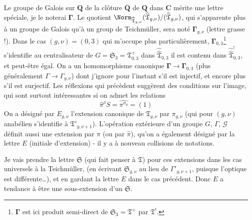 Le groupe de Galois sur $\mathbf{Q}$ de la clôture $\overline{\mathbf{Q}}$ de $\mathbf{Q}$ dans $\mathbf{C}$ mérite une lettre spéciale, je le noterai $\boldsymbol{\Gamma}$. Le quotient $\Norm_{\widehat{\mathfrak{T}}_{g, \nu}}(\widehat{\mathfrak{T}}_{g, \nu})/(\widehat{\mathfrak{T}}_{g, \nu})$, qui s'apparente plus à un groupe de Galois qu'à un group de Teichmüller, sera noté $\boldsymbol{\Gamma}_{g, \nu}$ (lettre grasse !). Dans le cas $(g, \nu) = (0, 3)$ qui m'occupe plus particulièrement, $\boldsymbol{\Gamma}_{0, 3}$\footnote{$\boldsymbol{\Gamma}$ est ici produit semi-direct de $\mathfrak{S}_3 = \mathfrak{T}^+$ par $\mathfrak{T}^!$.} s'identifie au centralisateur de $G = \mathfrak{S}_3 = \mathfrak{T}^+_{0, 3}$ dans $\hat{\hat{\mathfrak{T}}}_{0, 3}$ il est contenu dans $\hat{\hat{\mathfrak{T}}}^!_{0, 3}$, et peut-être égal. On a un homomorphisme canonique $\boldsymbol{\Gamma} \to \boldsymbol{\Gamma}_{0, 3}$ (plus généralement $\Gamma \to \Gamma_{g, \nu}$) dont j'ignore pour l'instant s'il est injectif, et encore plus s'il est surjectif. Les réflexions qui précèdent suggèrent des conditions sur l'image, qui sont surtout intéressantes si on admet les relations
$$
\widehat{\pi}^\rho S = \widehat{\pi^{\sigma_0}} = (1)
$$
On a désigné par $E_{g, \nu}$ l'extension canonique de $\mathfrak{T}_{g, \nu}$ par $\pi_{g, \nu}$ (qui pour $(g, \nu)$ anabélien s'identifie à $\mathfrak{T}'_{g, \nu + 1}$). L'opération extérieure d'un groupe $G$, $\Gamma$, $\mathcal{G}$ définit aussi une extension par $\pi$ (ou par $\widehat{\pi}$), qu'on a également désigné par la lettre $E$ (initiale d'extension) - il y a à nouveau collisions de notations.

Je vais prendre la lettre $\mathfrak{S}$ (qui fait penser à $\mathfrak{T}$) pour ces extensions dans les cas universels à la Teichmüller, (en écrivant $\mathfrak{S}_{g, \nu}$ au lieu de $\Gamma'_{g, \nu+1}$, puisque l'optique est différente\dots), et en gardant la lettre $E$ dans le cas précédent. Donc $E$ a tendance à être une sous-extension d'un $\mathfrak{S}$.

